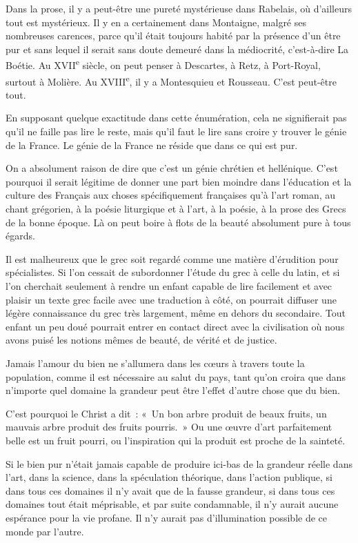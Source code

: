 \documentclass[french,twoside]{book} %
\begin{document}
Dans la prose, il y a peut-être une pureté mystérieuse dans Rabelais, où d'ailleurs tout est mystérieux. Il y en a certainement dans Montaigne, malgré ses nombreuses carences, parce qu'il était toujours habité par la présence d'un être pur et sans lequel il serait sans doute demeuré dans la médiocrité, c'est-à-dire La Boétie. Au XVII\textsuperscript{e} siècle, on peut penser à Descartes, à Retz, à Port-Royal, surtout à Molière. Au XVIII\textsuperscript{e}, il y a Montesquieu et Rousseau. C'est peut-être tout.\par
En supposant quelque exactitude dans cette énumération, cela ne signifierait pas qu'il ne faille pas lire le reste, mais qu'il faut le lire sans croire y trouver le génie de la France. Le génie de la France ne réside que dans ce qui est pur.\par
On a absolument raison de dire que c'est un génie chrétien et hellénique. C'est pourquoi il serait légitime de donner une part bien moindre dans l'éducation et la culture des Français aux choses spécifiquement françaises qu'à l'art roman, au chant grégorien, à la poésie liturgique et à l'art, à la poésie, à la prose des Grecs de la bonne époque. Là on peut boire à flots de la beauté absolument pure à tous égards.\par
Il est malheureux que le grec soit regardé comme une matière d'érudition pour spécialistes. Si l'on cessait de subordonner l'étude du grec à celle du latin, et si l'on cherchait seulement à rendre un enfant capable de lire facilement et avec plaisir un texte grec facile avec une traduction à côté, on pourrait diffuser une légère connaissance du grec très largement, même en dehors du secondaire. Tout enfant un peu doué pourrait entrer en contact direct avec la civilisation où nous avons puisé les notions mêmes de beauté, de vérité et de justice.\par
Jamais l'amour du bien ne s'allumera dans les cœurs à travers toute la population, comme il est nécessaire au salut du pays, tant qu'on croira que dans n'importe quel domaine la grandeur peut être l'effet d'autre chose que du bien.\par
C'est pourquoi le Christ a dit : « Un bon arbre produit de beaux fruits, un mauvais arbre produit des fruits pourris. » Ou une œuvre d'art parfaitement belle est un fruit pourri, ou l'inspiration qui la produit est proche de la sainteté.\par
Si le bien pur n'était jamais capable de produire ici-bas de la grandeur réelle dans l'art, dans la science, dans la spéculation théorique, dans l'action publique, si dans tous ces domaines il n'y avait que de la fausse grandeur, si dans tous ces domaines tout était méprisable, et par suite condamnable, il n'y aurait aucune espérance pour la vie profane. Il n'y aurait pas d'illumination possible de ce monde par l'autre.\par
\end{document}
